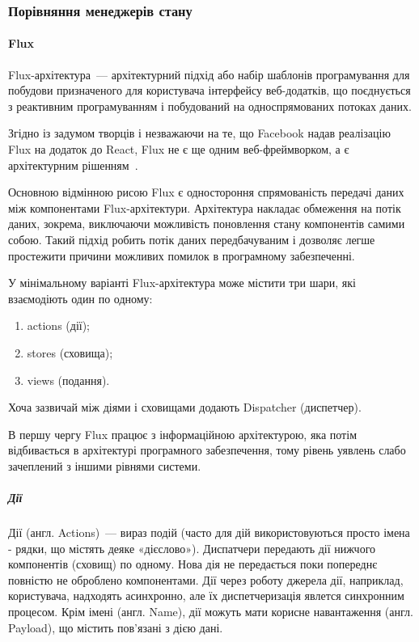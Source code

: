 \subsubsection{Порівняння менеджерів стану}

\paragraph{Flux}

Flux-архітектура~--- архітектурний підхід або набір шаблонів програмування для побудови призначеного для користувача інтерфейсу веб-додатків, що поєднується з реактивним програмуванням і побудований на односпрямованих потоках даних.

Згідно із задумом творців і незважаючи на те, що Facebook надав реалізацію Flux на додаток до React, Flux не є ще одним веб-фреймворком, а є архітектурним рішенням~\cite{petrenko2015порівняння}.

Основною відмінною рисою Flux є одностороння спрямованість передачі даних між компонентами Flux-архітектури. Архітектура накладає обмеження на потік даних, зокрема, виключаючи можливість поновлення стану компонентів самими собою. Такий підхід робить потік даних передбачуваним і дозволяє легше простежити причини можливих помилок в програмному забезпеченні.

У мінімальному варіанті Flux-архітектура може містити три шари, які взаємодіють один по одному:

\begin{enumerate}
    \item actions (дії);
    \item stores (сховища);
    \item views (подання).
\end{enumerate}

Хоча зазвичай між діями і сховищами додають Dispatcher (диспетчер).

В першу чергу Flux працює з інформаційною архітектурою, яка потім відбивається в архітектурі програмного забезпечення, тому рівень уявлень слабо зачеплений з іншими рівнями системи.

\subparagraph{Дії}
Дії (англ. Actions)~--- вираз подій (часто для дій використовуються просто імена - рядки, що містять деяке «дієслово»). Диспатчери передають дії нижчого компонентів (сховищ) по одному. Нова дія не передається поки попереднє повністю не оброблено компонентами. Дії через роботу джерела дії, наприклад, користувача, надходять асинхронно, але їх диспетчеризація явлется синхронним процесом. Крім імені (англ. Name), дії можуть мати корисне навантаження (англ. Payload), що містить пов'язані з дією дані.

